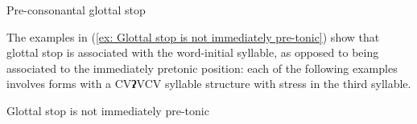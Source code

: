 \ea\label{ex: pre-consonantal glottal stop}
{Pre-consonantal glottal stop}

    \z
\z

The examples in (\ref{ex: Glottal stop is not immediately pre-tonic}) show that glottal stop is associated with the word-initial syllable, as opposed to being associated to the immediately pretonic position: each of the following examples involves forms with a CV\textbf{ʔ}VCV syllable structure with stress in the third syllable.

\ea\label{ex: Glottal stop is not immediately pre-tonic}
{Glottal stop is not immediately pre-tonic}

